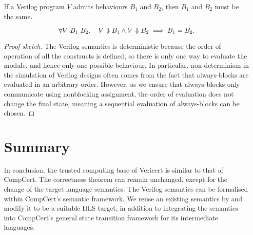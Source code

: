 \begin{lemma}\label{lemma:deterministic}
  If a Verilog program $V\!$ admits behaviours $B_1$ and $B_2$, then $B_1$ and
  $B_2$ must be the same.

  \begin{equation*}
    \forall V\ B_{1}\ B_{2}\ldotp\quad V \Downarrow B_{1} \land V \Downarrow B_{2} \implies B_{1} = B_{2}.
  \end{equation*}
\end{lemma}

\begin{proof}[Proof sketch]
  The Verilog semantics is deterministic because the order of operation of all
  the constructs is defined, so there is only one way to evaluate the module,
  and hence only one possible behaviour.  In particular, non-determinism in the
  simulation of Verilog designs often comes from the fact that always-blocks are
  evaluated in an arbitrary order.  However, as we ensure that always-blocks
  only communicate using nonblocking assignment, the order of evaluation does
  not change the final state, meaning a sequential evaluation of always-blocks
  can be chosen.
\end{proof}

\section{Summary}

In conclusion, the trusted computing base of Vericert is similar to that of
CompCert.  The correctness theorem can remain unchanged, except for the change
of the target language semantics.  The Verilog semantics can be formalised
within CompCert's semantic framework.  We reuse an existing semantics by
\textcite{lööw19_proof_trans_veril_devel_hol} and modify it to be a suitable
\gls{HLS} target, in addition to integrating the semantics into CompCert's
general state transition framework for its intermediate languages.

